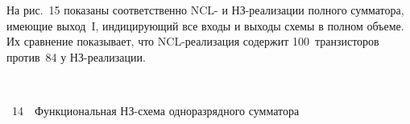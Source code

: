 \begin{multicols}{2}
 На рис.~15 показаны соответственно NCL- и НЗ-реа\-ли\-за\-ции полного 
сумматора, имеющие выход~I, индицирующий все входы и выходы схемы в полном объеме. 
Их сравнение показывает, что NCL-реализация содержит 100~транзисторов против~84 у 
       НЗ-реализации. 





\vspace*{6pt}

\begin{center}  %
\mbox{%
 \epsfxsize=77.552mm
 }
  \end{center}

  \vspace*{-2pt}

\noindent
{{\figurename~14}\ \ \small{Функциональная НЗ-схе\-ма одноразрядного сумматора}}


      
      

\addtocounter{figure}{2}

\end{multicols}

\begin{figure} %
   \vspace*{1pt}
 \begin{center}
 \mbox{%
 \epsfxsize=156.645mm
 }
 \end{center}
 \vspace*{-12pt}
\vspace*{-6pt}
\end{figure}

